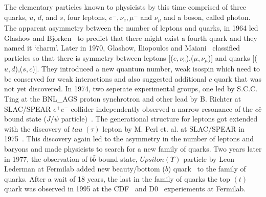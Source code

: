 The elementary particles known to physicists by this time comprised of three quarks, $u$, $d$, and $s$, four leptons, $e^{-}, \nu_{e}, \mu^{-}$ 
and $\nu_{\mu}$ and a boson, called photon. The apparent asymmetry between the number of leptons and quarks, in 1964 led Glashow and 
Bjorken~\cite{Bjorken:1964gz} to predict that there might exist a fourth quark  and they named it `charm'. Later in 1970, Glashow, 
Iliopoulos and Maiani~\cite{Glashow:1970gm} classified particles so that there is symmetry between leptons [($e,\nu_{e}$),($\mu, \nu_{\mu}$)] 
and quarks [($u,d$),($s,c$)]. They introduced a new quantum number, weak isospin which need to be conserved for weak interactions and also 
suggested additional $c$ quark that was not yet discovered. In 1974, two seperate experimental groups, one led by S.C.C. Ting at the \gls{BNL_AGS}
proton synchrotron and other lead by B. Richter at SLAC/\gls{SPEAR} $e^{+}e^{-}$ collider independently observed a narrow resonance of the $c\bar{c}$ 
bound state ($J/\psi$ particle)~\cite{Aubert:1974js,Augustin:1974xw}. The generational structure for leptons got extended with the discovery of 
$tau\;(\tau)$ lepton by M. Perl et. al. at SLAC/SPEAR in 1975~\cite{Perl:1975bf}. This discovery again led to the asymmetry in the number of 
leptons and baryons and made physicists to search for a new family of quarks. Two years later in 1977, the observation of $b\bar{b}$ bound state, 
$Upsilon (\Upsilon)$ particle by Leon Lederman at Fermilab added new beauty/bottom ($b$) quark~\cite{Herb:1977ek} to the family of quarks. 
After a wait of 18 years, the last in the family of quarks the top $(t)$ quark was observed in 1995 at the \gls{CDF}~\cite{Abe:1995hr} and 
\gls{D0}~\cite{Abachi:1995iq} experiements at Fermilab.

